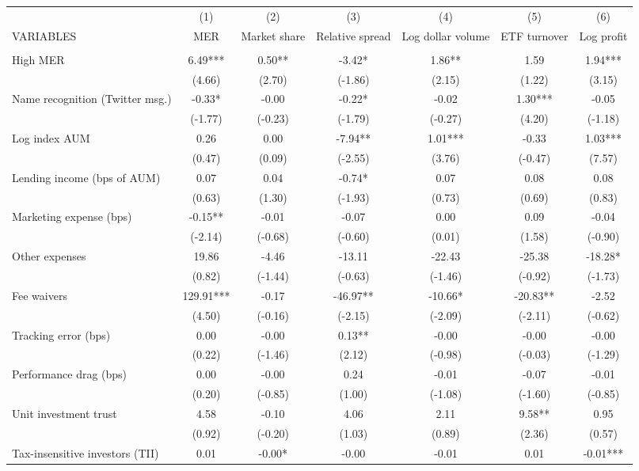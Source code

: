 \documentclass[]{article}
\begin{document}
\begin{tabular}{lcccccc} \hline
 & (1) & (2) & (3) & (4) & (5) & (6) \\
VARIABLES & MER & Market share & Relative spread & Log dollar volume & ETF turnover & Log profit \\ \hline
 &  &  &  &  &  &  \\
High MER & 6.49*** & 0.50** & -3.42* & 1.86** & 1.59 & 1.94*** \\
 & (4.66) & (2.70) & (-1.86) & (2.15) & (1.22) & (3.15) \\
Name recognition (Twitter msg.) & -0.33* & -0.00 & -0.22* & -0.02 & 1.30*** & -0.05 \\
 & (-1.77) & (-0.23) & (-1.79) & (-0.27) & (4.20) & (-1.18) \\
Log index AUM & 0.26 & 0.00 & -7.94** & 1.01*** & -0.33 & 1.03*** \\
 & (0.47) & (0.09) & (-2.55) & (3.76) & (-0.47) & (7.57) \\
Lending income (bps of AUM) & 0.07 & 0.04 & -0.74* & 0.07 & 0.08 & 0.08 \\
 & (0.63) & (1.30) & (-1.93) & (0.73) & (0.69) & (0.83) \\
Marketing expense (bps) & -0.15** & -0.01 & -0.07 & 0.00 & 0.09 & -0.04 \\
 & (-2.14) & (-0.68) & (-0.60) & (0.01) & (1.58) & (-0.90) \\
Other expenses & 19.86 & -4.46 & -13.11 & -22.43 & -25.38 & -18.28* \\
 & (0.82) & (-1.44) & (-0.63) & (-1.46) & (-0.92) & (-1.73) \\
Fee waivers & 129.91*** & -0.17 & -46.97** & -10.66* & -20.83** & -2.52 \\
 & (4.50) & (-0.16) & (-2.15) & (-2.09) & (-2.11) & (-0.62) \\
Tracking error (bps) & 0.00 & -0.00 & 0.13** & -0.00 & -0.00 & -0.00 \\
 & (0.22) & (-1.46) & (2.12) & (-0.98) & (-0.03) & (-1.29) \\
Performance drag (bps) & 0.00 & -0.00 & 0.24 & -0.01 & -0.07 & -0.01 \\
 & (0.20) & (-0.85) & (1.00) & (-1.08) & (-1.60) & (-0.85) \\
Unit investment trust & 4.58 & -0.10 & 4.06 & 2.11 & 9.58** & 0.95 \\
 & (0.92) & (-0.20) & (1.03) & (0.89) & (2.36) & (0.57) \\
Tax-insensitive investors (TII) & 0.01 & -0.00* & -0.00 & -0.01 & 0.01 & -0.01*** \\

\end{tabular}
\end{document}
